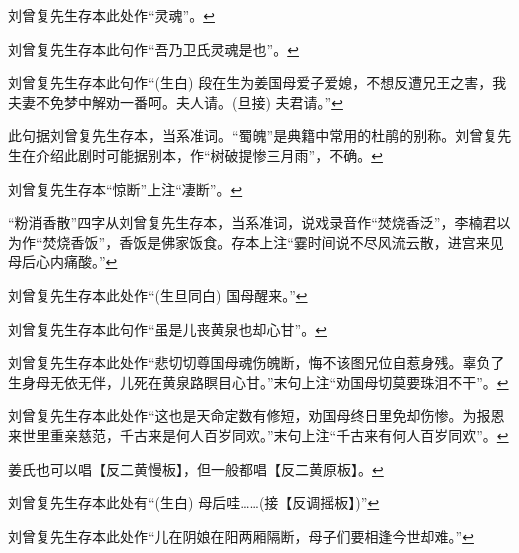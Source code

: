\item
  \leavevmode\hypertarget{fn16}{}%
  刘曾复先生存本此处作``灵魂''。\protect\hyperlink{fnref16}{↩}
\item
  \leavevmode\hypertarget{fn17}{}%
  刘曾复先生存本此句作``吾乃卫氏灵魂是也''。\protect\hyperlink{fnref17}{↩}
\item
  \leavevmode\hypertarget{fn18}{}%
  刘曾复先生存本此句作``(生白)
  段在生为姜国母爱子爱媳，不想反遭兄王之害，我夫妻不免梦中解劝一番呵。夫人请。(旦接)
  夫君请。''\protect\hyperlink{fnref18}{↩}
\item
  \leavevmode\hypertarget{fn19}{}%
  此句据刘曾复先生存本，当系准词。``蜀魄''是典籍中常用的杜鹃的别称。刘曾复先生在介绍此剧时可能据别本，作``树破提惨三月雨''，不确。\protect\hyperlink{fnref19}{↩}
\item
  \leavevmode\hypertarget{fn20}{}%
  刘曾复先生存本``惊断''上注``凄断''。\protect\hyperlink{fnref20}{↩}
\item
  \leavevmode\hypertarget{fn21}{}%
  ``粉消香散''四字从刘曾复先生存本，当系准词，说戏录音作``焚烧香泛''，李楠君以为作``焚烧香饭''，香饭是佛家饭食。存本上注``霎时间说不尽风流云散，进宫来见母后心内痛酸。''\protect\hyperlink{fnref21}{↩}
\item
  \leavevmode\hypertarget{fn22}{}%
  刘曾复先生存本此处作``(生旦同白)
  国母醒来。''\protect\hyperlink{fnref22}{↩}
\item
  \leavevmode\hypertarget{fn23}{}%
  刘曾复先生存本此句作``虽是儿丧黄泉也却心甘''。\protect\hyperlink{fnref23}{↩}
\item
  \leavevmode\hypertarget{fn24}{}%
  刘曾复先生存本此处作``悲切切尊国母魂伤魄断，悔不该图兄位自惹身残。辜负了生身母无依无伴，儿死在黄泉路瞑目心甘。''末句上注``劝国母切莫要珠泪不干''。\protect\hyperlink{fnref24}{↩}
\item
  \leavevmode\hypertarget{fn25}{}%
  刘曾复先生存本此处作``这也是天命定数有修短，劝国母终日里免却伤惨。为报恩来世里重亲慈范，千古来是何人百岁同欢。''末句上注``千古来有何人百岁同欢''。\protect\hyperlink{fnref25}{↩}
\item
  \leavevmode\hypertarget{fn26}{}%
  姜氏也可以唱【反二黄慢板】，但一般都唱【反二黄原板】。\protect\hyperlink{fnref26}{↩}
\item
  \leavevmode\hypertarget{fn27}{}%
  刘曾复先生存本此处有``(生白)
  母后哇\ldots{}\ldots{}(接【反调摇板】)''\protect\hyperlink{fnref27}{↩}
\item
  \leavevmode\hypertarget{fn28}{}%
  刘曾复先生存本此处作``儿在阴娘在阳两厢隔断，母子们要相逢今世却难。''\protect\hyperlink{fnref28}{↩}
\item
